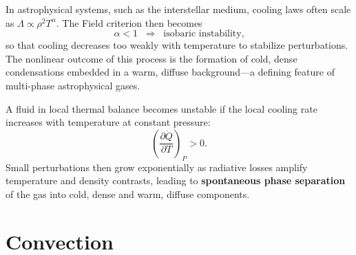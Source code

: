 In astrophysical systems, such as the interstellar medium, cooling laws often scale as $\Lambda \propto \rho^2 T^\alpha$.  
The Field criterion then becomes
\[
\alpha < 1 \;\;\Longrightarrow\;\; \text{isobaric instability,}
\]
so that cooling decreases too weakly with temperature to stabilize perturbations.  
The nonlinear outcome of this process is the formation of cold, dense condensations embedded in a warm, diffuse background—a defining feature of multi-phase astrophysical gases.

\begin{bigidea}
A fluid in local thermal balance becomes unstable if the local cooling rate increases with temperature at constant pressure:
\[
\left(\frac{\partial \dot{Q}}{\partial T}\right)_P > 0.
\]
Small perturbations then grow exponentially as radiative losses amplify temperature and density contrasts, leading to \textbf{spontaneous phase separation} of the gas into cold, dense and warm, diffuse components.
\end{bigidea}

\section{Convection}



